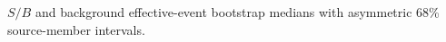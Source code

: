 $S/B$ and background effective-event bootstrap medians with asymmetric 68\% source-member intervals.
